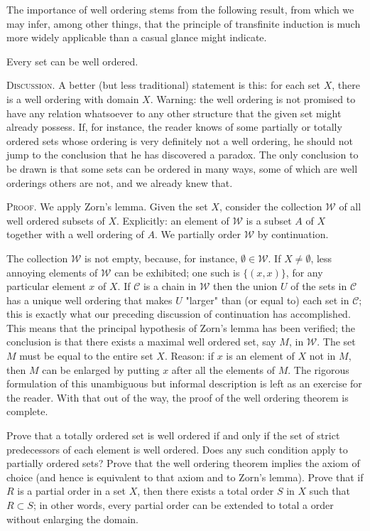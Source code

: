 The importance of well ordering stems from the following result, from which we may infer, among other things, that the principle of transfinite induction is much more widely applicable than a casual glance might indicate. 

\begin{named} Every set can be well ordered. 
\end{named}

\textsc{Discussion}. A better (but less traditional) statement is this: for each set $X$, there is a well ordering with domain $X$. Warning: the well ordering is not promised to have any relation whatsoever to any other structure that the given set might already possess. If, for instance, the reader knows of some partially or totally ordered sets whose ordering is very definitely not a well ordering, he should not jump to the conclusion that he has discovered a paradox. The only conclusion to be drawn is that some sets can be ordered in many ways, some of which are well orderings others are not, and we already knew that. 

\textsc{Proof}. We apply Zorn's lemma. Given the set $X$, consider the collection $\mathcal{W}$ of all well ordered subsets of $X$. Explicitly: an element of $\mathcal{W}$ is a subset $A$ of $X$ together with a well ordering of $A$. We partially order $\mathcal{W}$ by continuation. 

The collection $\mathcal{W}$ is not empty, because, for instance, $\emptyset \in \mathcal{W}$. If $X \neq \emptyset$, less annoying elements of $\mathcal{W}$ can be exhibited; one such is $\{ (x,x) \}$, for any particular element $x$ of $X$. If $\mathcal{C}$ is a chain in $\mathcal{W}$ then the union $U$ of the sets in $\mathcal{C}$ has a unique well ordering that makes $U$ "larger" than (or equal to) each set in $\mathcal{C}$; this is exactly what our preceding discussion of continuation has accomplished. This means that the principal hypothesis of Zorn's lemma has been verified; the conclusion is that there exists a maximal well ordered set, say $M$, in $\mathcal{W}$. The set $M$ must be equal to the entire set $X$. Reason: if $x$ is an element of $X$ not in $M$, then $M$ can be enlarged by putting $x$ after all the elements of $M$. The rigorous formulation of this unambiguous but informal description is left as an exercise for the reader. With that out of the way, the proof of the well ordering theorem is complete. 

\begin{exercise}[Exercise. ] Prove that a totally ordered set is well ordered if and only if the set of strict predecessors of each element is well ordered. Does any such condition apply to partially ordered sets? Prove that the well ordering theorem implies the axiom of choice (and hence is equivalent to that axiom and to Zorn's lemma). Prove that if $R$ is a partial order in a set $X$, then there exists a total order $S$ in $X$ such that $R \subset S$; in other words, every partial order can be extended to total a order without enlarging the domain.
\end{exercise}